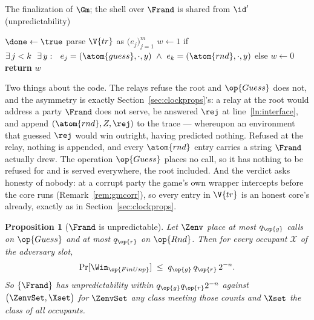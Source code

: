\documentclass[10pt,oneside,openany]{book}
\theoremstyle{accentdef}
\theoremstyle{accentplain}
\newtheorem{proposition}[definition]{Proposition}
\begin{document}
\begin{interface}[nofloat]{The finalization of $\Gm$; the shell over $\Frand$ is shared}
 \quad from $\id'$ \quad (unpredictability)
\begin{algorithmic}[1]
\algcont
\Req{$\neg\done$}
\State $\done \gets \true$
\State parse $\V{tr}$ as $\bigl(e_j\bigr)_{j=1}^{m}$
\State $w \gets 1$ if $\exists\, j < k \ \ \exists\, y :\ \
       e_j = (\atom{guess},\cdot,y) \ \wedge\ e_k = (\atom{rnd},\cdot,y)$ \label{ln:gunp}
\State else $w \gets 0$
\State \textbf{return} $w$
\end{algorithmic}
\end{interface}

Two things about the code. The relays refuse the root and $\op{Guess}$ does not, and the asymmetry
is exactly Section~\ref{sec:clockprops}'s: a relay at the root would address a party $\Frand$
does not serve, be answered $\rej$ at line~\ref{ln:interface}, and append $(\atom{rnd},Z,\rej)$ to
the trace --- whereupon an environment that guessed $\rej$ would win outright, having predicted
nothing. Refused at the relay, nothing is appended, and every $\atom{rnd}$ entry carries a string
$\Frand$ actually drew. The operation $\op{Guess}$ places no call, so it has nothing to be refused for and is
served everywhere, the root included. And the verdict asks honesty of nobody: at a corrupt party
the game's own wrapper intercepts before the core runs (Remark~\ref{rem:gmcorr}), so every entry
in $\V{tr}$ is an honest core's already, exactly as in Section~\ref{sec:clockprops}.

\begin{proposition}[$\Frand$ is unpredictable]\label{prop:randunp}
Let $\Zenv$ place at most $q_{\op{g}}$ calls on $\op{Guess}$ and at most $q_{\op{r}}$ on
$\op{Rnd}$. Then for every occupant $\mathcal{X}$ of the adversary slot,
\[
  \Pr[\Win_{\op{FinUnp}}] \;\leq\; q_{\op{g}} \, q_{\op{r}} \, 2^{-n} .
\]
So $\{\Frand\}$ has unpredictability within $q_{\op{g}} q_{\op{r}} 2^{-n}$ against
$\bigl(\ZenvSet,\Xset\bigr)$ for $\ZenvSet$ any class meeting those counts and $\Xset$ the class
of all occupants.
\end{proposition}
\end{document}
